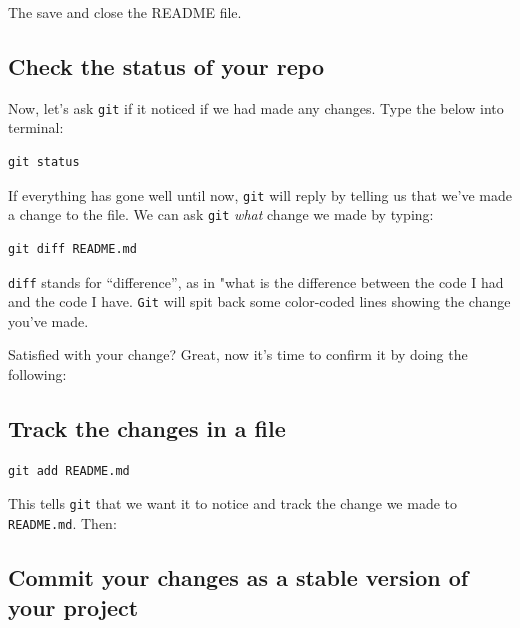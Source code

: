 \documentclass[]{book}
\begin{document}
The save and close the README file.

\hypertarget{check-the-status-of-your-repo}{%
\subsection*{Check the status of your repo}\label{check-the-status-of-your-repo}}

Now, let's ask \texttt{git} if it noticed if we had made any changes. Type the below into terminal:

\begin{verbatim}
git status
\end{verbatim}

If everything has gone well until now, \texttt{git} will reply by telling us that we've made a change to the file. We can ask \texttt{git} \emph{what} change we made by typing:

\begin{verbatim}
git diff README.md
\end{verbatim}

\texttt{diff} stands for ``difference'', as in "what is the difference between the code I had and the code I have. \texttt{Git} will spit back some color-coded lines showing the change you've made.

Satisfied with your change? Great, now it's time to confirm it by doing the following:

\hypertarget{track-the-changes-in-a-file}{%
\subsection*{Track the changes in a file}\label{track-the-changes-in-a-file}}

\begin{verbatim}
git add README.md
\end{verbatim}

This tells \texttt{git} that we want it to notice and track the change we made to \texttt{README.md}. Then:

\hypertarget{commit-your-changes-as-a-stable-version-of-your-project}{%
\subsection*{Commit your changes as a stable version of your project}\label{commit-your-changes-as-a-stable-version-of-your-project}}
\end{document}
